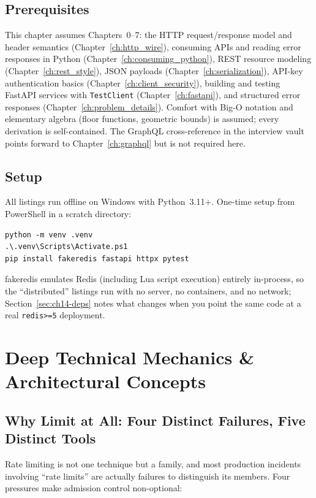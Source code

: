 \subsection*{Prerequisites}
This chapter assumes Chapters~0--7: the HTTP request/response model and
header semantics (Chapter~\ref{ch:http_wire}), consuming APIs and reading
error responses in Python (Chapter~\ref{ch:consuming_python}), REST resource
modeling (Chapter~\ref{ch:rest_style}), JSON payloads
(Chapter~\ref{ch:serialization}), API-key authentication basics
(Chapter~\ref{ch:client_security}), building and testing FastAPI services
with \texttt{TestClient} (Chapter~\ref{ch:fastapi}), and structured error
responses (Chapter~\ref{ch:problem_details}). Comfort with Big-O notation
and elementary algebra (floor functions, geometric bounds) is assumed; every
derivation is self-contained. The GraphQL cross-reference in the interview
vault points forward to Chapter~\ref{ch:graphql} but is not required here.

\subsection*{Setup}
All listings run offline on Windows with Python~3.11+. One-time setup from
PowerShell in a scratch directory:

\begin{verbatim}
python -m venv .venv
.\.venv\Scripts\Activate.ps1
pip install fakeredis fastapi httpx pytest
\end{verbatim}

fakeredis emulates Redis (including Lua script execution) entirely
in-process, so the ``distributed'' listings run with no server, no
containers, and no network; Section~\ref{sec:ch14-deps} notes what changes
when you point the same code at a real \texttt{redis>=5} deployment.
\section{Deep Technical Mechanics \& Architectural Concepts}
\label{sec:ch14-mechanics}

\subsection{Why Limit at All: Four Distinct Failures, Five Distinct Tools}
\label{subsec:ch14-why}

Rate limiting is not one technique but a family, and most production
incidents involving ``rate limits'' are actually failures to distinguish its
members. Four pressures make admission control non-optional:

